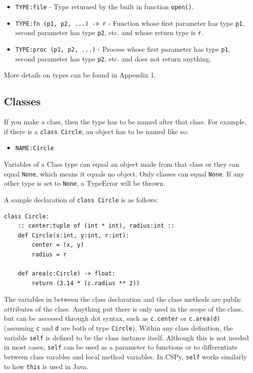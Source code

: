\documentclass{article}
\begin{document}
\begin{itemize}
\item \verb|TYPE:file| - Type returned by the built in function \verb|open()|.

\item \verb|TYPE:fn (p1, p2, ...) -> r| - Function whose first parameter has type \verb|p1|, second parameter has type \verb|p2|, etc. and whose return type is \verb|r|.

\item \verb|TYPE:proc (p1, p2, ...)| - Process whose first parameter has type \verb|p1|, second parameter has type \verb|p2|, etc. and does not return anything. 
\end{itemize}

More details on types can be found in Appendix 1.
\subsection{Classes}
If you make a class, then the type has to be named after that class. For example, if there is a \verb|class Circle|, an object has to be named like so: 

\begin{itemize}
\item \verb|NAME:Circle|
\end{itemize}

Variables of a Class type can equal an object made from that class or they can equal \verb|None|, which means it equals no object. Only classes can equal \verb|None|. If any other type is set to \verb|None|, a TypeError will be thrown.

A sample declaration of \verb|class Circle| is as follows:
\begin{verbatim}
class Circle:
    :: center:tuple of (int * int), radius:int ::
    def Circle(x:int, y:int, r:int):
        center = (x, y)
        radius = r

    def area(c:Circle) -> float:
        return (3.14 * (c.radius ** 2))
\end{verbatim}
The variables in between the class declaration and the class methods are public attributes of the class. Anything put there is only used in the scope of the class, but can be accessed through dot syntax, such as \verb|c.center| or \verb|c.area(d)| (assuming \verb|c| and \verb|d| are both of type \verb|Circle|). Within any class definition, the variable \verb|self| is defined to be the class instance itself. Although this is not needed in most cases, \verb|self| can be used as a parameter to functions or to differentiate between class varables and local method variables. In CSPy, \verb|self| works similarly to how \verb|this| is used in Java.
\end{document}
